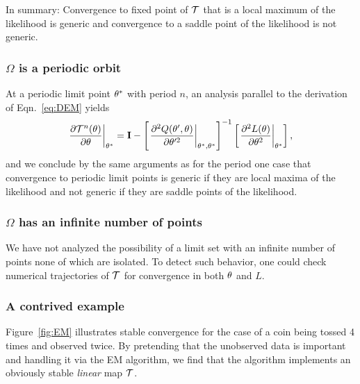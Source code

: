 In summary: Convergence to fixed point of $\EMmap$ that is a local
maximum of the likelihood is generic and convergence to a saddle point
of the likelihood is not generic.

\subsubsection{$\Omega $ is a periodic orbit}
\label{sec:EMperiodic}

At a periodic limit point $\theta^*$ with period $n$, an analysis
parallel to the derivation of Eqn.~\eqref{eq:DEM} yields
\begin{equation*}
  \label{eq:DEM-periodic}
  \left. \frac{\partial \EMmap^n(\parameters)}{\partial \parameters}
  \right|_{\parameters^*} = \id -
  \left[ \left. \frac{\partial^2 Q(\parameters',\parameters)}{\partial
        \parameters'^2} \right|_{\parameters^*,\parameters^*} \right]^{-1}
  \left[ \left. \frac{\partial^2 L(\parameters)}{\partial
        \parameters^2} \right|_{\parameters^*} \right],
\end{equation*}
and we conclude by the same arguments as for the period one case that
convergence to periodic limit points is generic if they are local
maxima of the likelihood and not generic if they are saddle points of
the likelihood.

\subsubsection{$\Omega $  has an infinite number of points}
\label{sec:EMstrange}

We have not analyzed the possibility of a limit set with an infinite
number of points none of which are isolated.  To detect such behavior,
one could check numerical trajectories of $\EMmap$ for convergence in
both $\theta$ and $L$.

\subsubsection{A contrived example}
\label{sec:contrived}


Figure~\ref{fig:EM} illustrates stable convergence for the case of a
coin being tossed 4 times and observed twice.  By pretending that the
unobserved data is important and handling it via the EM algorithm, we
find that the algorithm implements an obviously stable \emph{linear}
map $\EMmap$.

